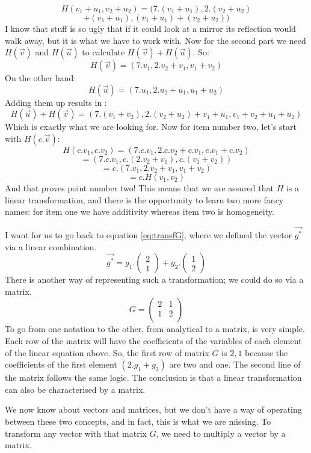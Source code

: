 \documentclass[600paper, 11pt,twoside,openany]{kdp}
\begin{document}
\[ H(v_1 + u_1, v_2 + u_2) = (7.(v_1 + u_1), 2.(v_2 + u_2)  \]
\[ + (v_1 + u_1), (v_1 + u_1) + (v_2 + u_2))\]
\indent I know that stuff is so ugly that if it could look at a mirror its reflection would walk away, but it is what we have to work with. Now for the second part we need $H(\overrightarrow{v})$ and $H(\overrightarrow{u})$ to calculate $H(\overrightarrow{v}) + H(\overrightarrow{u})$. So:
\[H(\overrightarrow{v}) = (7.v_1, 2.v_2 + v_1, v_1 + v_2)\]
\indent On the other hand:
\[H(\overrightarrow{u}) = (7.u_1, 2.u_2 + u_1, u_1 + u_2)\]
\indent Adding them up results in :
\[H(\overrightarrow{u}) + H(\overrightarrow{v}) = (7.(v_1 + v_2), 2.(v_2 + u_2) + v_1 + u_1, v_1 + v_2 + u_1 + u_2 )\]
\indent Which is exactly what we are looking for. Now for item number two, let's start with $H(c.\overrightarrow{v})$:
\[H(c.v_1, c.v_2) = (7.c.v_1, 2.c.v_2 + c.v_1, c.v_1 + c.v_2)\]
\[=(7.c.v_1, c.(2.v_2 + v_1), c.(v_1 + v_2))\]
\[=c.(7.v_1, 2.v_2 + v_1, v_1 + v_2 )\]
\[=c.H(v_1, v_2)\]
\indent And that proves point number two! This means that we are assured that $H$ is a linear transformation, and there is the opportunity to learn two more fancy names: for item one we have additivity whereas item two is homogeneity.
\par 
\vspace{-3pt}
\indent I want for us to go back to equation \ref{eq:transfG}, where we defined the vector $\overrightarrow{g^*}$ via a linear combination.
\[\overrightarrow{g^*} = g_1.\begin{pmatrix}
 2\\
 1
 \end{pmatrix} + g_2.\begin{pmatrix}
 1\\
 2
 \end{pmatrix}\]
\indent There is another way of representing such a transformation; we could do so via a matrix.
\[G = 
\begin{pmatrix}
2 & 1 \\
1 & 2 \\
\end{pmatrix}
\]
\indent To go from one notation to the other, from analytical to a matrix, is very simple. Each row of the matrix will have the coefficients of the variables of each element of the linear equation above. So, the first row of matrix $G$ is $2,1$ because the coefficients of the first element $(2.g_1+g_2)$ are two and one. The second line of the matrix follows the same logic. The conclusion is that a linear transformation can also be characterised by a matrix.
\par 
\vspace{-3pt}
\indent We now know about vectors and matrices, but we don’t have a way of operating between these two concepts, and in fact, this is what we are missing. To transform any vector with that matrix $G$, we need to multiply a vector by a matrix.
\end{document}
